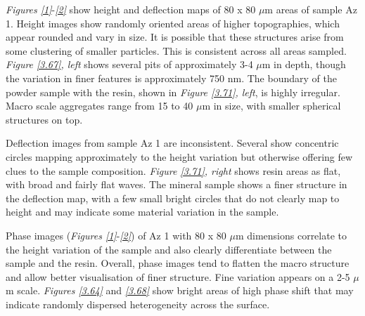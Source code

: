 \textit{Figures \ref{1}}-\textit{\ref{2}} show height and deflection maps of 80 x 80 $\mu$m areas of sample Az 1. Height images show randomly oriented areas of higher topographies, which appear rounded and vary in size. It is possible that these structures arise from some clustering of smaller particles. This is consistent across all areas sampled. \textit{Figure \ref{3.67}, left} shows several pits of approximately 3-4 $\mu$m in depth, though the variation in finer features is approximately 750 nm. The boundary of the powder sample with the resin, shown in \textit{Figure \ref{3.71}, left}, is highly irregular. Macro scale aggregates range from 15 to 40 $\mu$m in size, with smaller spherical structures on top.

Deflection images from sample Az 1 are inconsistent. Several show concentric circles mapping approximately to the height variation but otherwise offering few clues to the sample composition. \textit{Figure \ref{3.71}, right} shows resin areas as flat, with broad and fairly flat waves. The mineral sample shows a finer structure in the deflection map, with a few small bright circles that do not clearly map to height and may indicate some material variation in the sample.

Phase images (\textit{Figures \ref{1}}-\textit{\ref{2}}) of Az 1 with 80 x 80 $\mu$m dimensions correlate to the height variation of the sample and also clearly differentiate between the sample and the resin. Overall, phase images tend to flatten the macro structure and allow better visualisation of finer structure. Fine variation appears on a 2-5 $\mu$m scale. \textit{Figures \ref{3.64}} and \textit{\ref{3.68}} show bright areas of high phase shift that may indicate randomly dispersed heterogeneity across the surface.  

